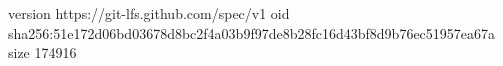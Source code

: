 version https://git-lfs.github.com/spec/v1
oid sha256:51e172d06bd03678d8bc2f4a03b9f97de8b28fc16d43bf8d9b76ec51957ea67a
size 174916
